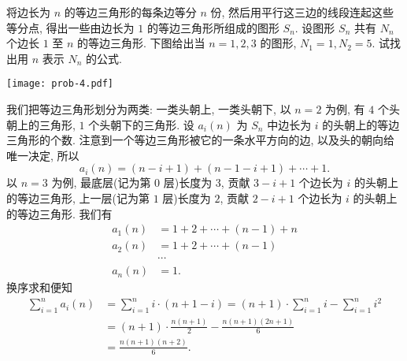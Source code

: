\begin{prob}
\label{prob:prob-4}
将边长为 $n$ 的等边三角形的每条边等分 $n$ 份,
然后用平行这三边的线段连起这些等分点,
得出一些由边长为 $1$ 的等边三角形所组成的图形 $S_n$.
设图形 $S_n$ 共有 $N_n$ 个边长 $1$ 至 $n$ 的等边三角形.
下图给出当 $n=1,2,3$ 的图形, $N_1 = 1, N_2 = 5$.
试找出用 $n$ 表示 $N_n$ 的公式.
\begin{center}
\texttt{[image: prob-4.pdf]}
\end{center}
\end{prob}

\begin{soln}
我们把等边三角形划分为两类: 一类头朝上, 一类头朝下,
以 $n=2$ 为例, 有 $4$ 个头朝上的三角形, $1$ 个头朝下的三角形.
设 $a_i(n)$ 为 $S_n$ 中边长为 $i$ 的头朝上的等边三角形的个数.
注意到一个等边三角形被它的一条水平方向的边, 以及头的朝向给唯一决定, 所以
\begin{equation}
\label{eq3}
a_i(n) = (n-i+1) + (n-1-i+1) + \cdots + 1.
\end{equation}
以 $n=3$ 为例, 最底层(记为第 $0$ 层)长度为 $3$,
贡献 $3-i+1$ 个边长为 $i$ 的头朝上的等边三角形,
上一层(记为第 $1$ 层)长度为 $2$,
贡献 $2-i+1$ 个边长为 $i$ 的头朝上的等边三角形.
我们有
\begin{align*}
a_1(n)&=1 + 2 + \cdots + (n-1) + n\\
a_2(n)&=1 + 2 + \cdots + (n-1)\\
      &\cdots\\
a_n(n)&=1.
\end{align*}
换序求和便知
\begin{align*}
\sum_{i=1}^n a_i(n) &= \sum_{i=1}^n i\cdot(n+1-i) = (n+1)\cdot\sum_{i=1}^n i - \sum_{i=1}^n i^2\\
&=(n+1)\cdot \frac{n(n+1)}{2} - \frac{n(n+1)(2n+1)}{6}\\
&=\frac{n(n+1)(n+2)}{6}.
\end{align*}


\end{soln}
